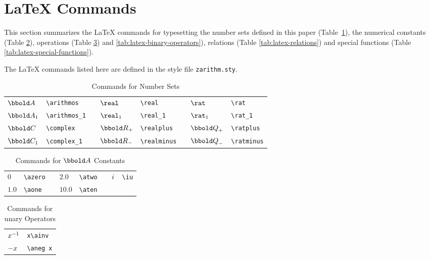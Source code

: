 \documentclass[12pt]{article}
\begin{document}
\section{\LaTeX{} Commands}
\label{sec:latex-commands}
This section summarizes the \LaTeX{} commands for typesetting the
number sets defined in this paper (Table~\ref{tab:latex-number-sets}),
the numerical constants (Table \ref{tab:latex-constants}), operations
(Table \ref{tab:latex-unary-operators}) and
\ref{tab:latex-binary-operators}), relations (Table
\ref{tab:latex-relations}) and special functions (Table
\ref{tab:latex-special-functions}).

The \LaTeX{} commands listed here are defined in the style file
\verb|zarithm.sty|.

\begin{table}[htbp]
  \centering
  \begin{tabular}{llp{1cm}llp{1cm}ll}
    $\arithmos$    & \verb|\arithmos| && $\real$ & \verb|\real|&& $\rat$ & \verb|\rat| \\
    $\arithmos_1$  & \verb|\arithmos_1| && $\real_1$ & \verb|\real_1| && $\rat_1$ & \verb|\rat_1| \\
    $\complex$ & \verb|\complex| &&  $\realplus$ & \verb|\realplus| && $\ratplus$ & \verb|\ratplus| \\ 
    $\complex_1$ & \verb|\complex_1| && $\realminus$ & \verb|\realminus| && $\ratminus$ & \verb|\ratminus| \\
  \end{tabular}
  \caption{Commands for Number Sets}
  \label{tab:latex-number-sets}
\end{table}
%
\begin{table}[htbp]
  \centering
  \begin{tabular}{llp{1cm}llp{1cm}ll}
    $0$    & \verb|\azero| && $2.0$  & \verb|\atwo| && ${i\mkern1mu}$  & \verb|\iu| \\
    $1.0$  & \verb|\aone| && $10.0$ & \verb|\aten| && & \\
  \end{tabular}
  \caption{Commands for $\arithmos$ Constants}
  \label{tab:latex-constants}
\end{table}
%
\begin{table}[htbp]
  \centering
  \begin{tabular}{ll}
    $x^{-1}$    & \verb|x\ainv| \\
    $- x$    & \verb|\aneg x| \\
  \end{tabular}
  \caption{Commands for unary Operators}
  \label{tab:latex-unary-operators}
\end{table}
\end{document}
